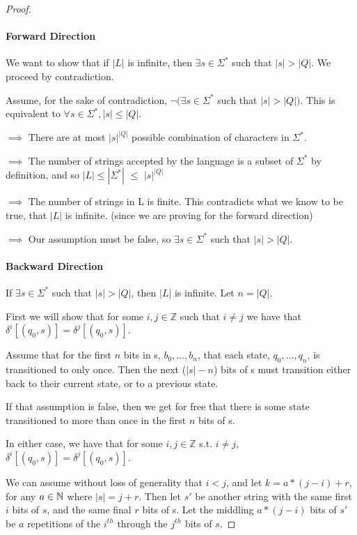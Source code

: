 \documentclass[11pt]{article}
\begin{document}
\begin{proof}

\paragraph{Forward Direction}

We want to show that if $|L|$ is infinite, then $\exists s\in \Sigma^* $ such that  $|s| > |Q|$. We proceed by contradiction.

Assume, for the sake of contradiction, $\neg (\exists s \in \Sigma^* $ such that  $|s| > |Q|)$. This is equivalent to $\forall s \in \Sigma^*, |s| \leq |Q|$. 

$\implies$ There are at most ${|s|}^{|Q|}$ possible combination of characters in $\Sigma^*$.

$\implies$ The number of strings accepted by the language is a subset of ${\Sigma}^{*}$ by definition, and so $|L| \leq |\Sigma^*|$ $\leq$ ${|s|}^{|Q|}$

$\implies$ The number of strings in L is finite. This contradicts what we know to be true, that $|L|$ is infinite. (since we are proving for the forward direction)

$\implies$ Our assumption must be false, so $\exists s\in \Sigma^* $ such that  $|s|  > |Q|$.

\paragraph{Backward Direction}

If $\exists s\in \Sigma^* $ such that $|s| > |Q|$, then $|L|$ is infinite. Let $n = |Q|$.

First we will show that for some $i,j \in \mathbb{Z}$ such that $i \neq j$ we have that $\delta^{i}[(q_{0},s)] = \delta^{j}[(q_{0},s)]$.

Assume that for the first $n$ bits in s, $b_{0}, ... , b_{n}$, that each state, $q_{0},..., q_{n}$, is transitioned to only once. Then the next ($|s|-n$) bits of s must transition either back to their current state, or to a previous state.

If that assumption is false, then we get for free that there is some state transitioned to more than once in the first $n$ bits of s.

In either case, we have that for some $i,j \in \mathbb{Z}$ s.t. $i \neq j$, $\delta^{i}[(q_{0},s)] = \delta^{j}[(q_{0},s)]$.

We can assume without loss of generality that $i < j$, and let $k = a*(j-i)+r$, for any $a\in \mathbb{N}$ where $|s| = j + r$. Then let $s'$ be another string with the same first $i$ bits of $s$, and the same final $r$ bits of s. Let the middling $a*(j-i)$ bits of $s'$ be $a$ repetitions of the $i^{th}$ through the $j^{th}$ bits of $s$.


\end{proof}
\end{document}
